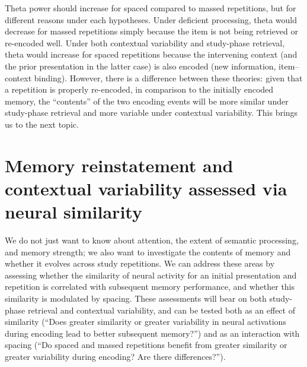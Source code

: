 Theta power should increase for spaced compared to massed repetitions, but for different reasons under each hypotheses.  Under deficient processing, theta would decrease for massed repetitions simply because the item is not being retrieved or re-encoded well.
Under both contextual variability and study-phase retrieval, theta would increase for spaced repetitions because the intervening context (and the prior presentation in the latter case) is also encoded (new information, item--context binding).
However, there is a difference between these theories: given that a repetition is properly re-encoded, in comparison to the initially encoded memory, the ``contents'' of the two encoding events will be more similar under study-phase retrieval and more variable under contextual variability.  This brings us to the next topic.




\section{Memory reinstatement and contextual variability assessed via neural similarity}

We do not just want to know about attention, the extent of semantic processing, and memory strength; we also want to investigate the contents of memory and whether it evolves across study repetitions.
We can address these areas by assessing whether the similarity of neural activity for an initial presentation and repetition is correlated with subsequent memory performance, and whether this similarity is modulated by spacing.  These assessments will bear on both study-phase retrieval and contextual variability, and can be tested both as an effect of similarity (``Does greater similarity or greater variability in neural activations during encoding lead to better subsequent memory?'') and as an interaction with spacing (``Do spaced and massed repetitions benefit from greater similarity or greater variability during encoding?  Are there differences?'').


